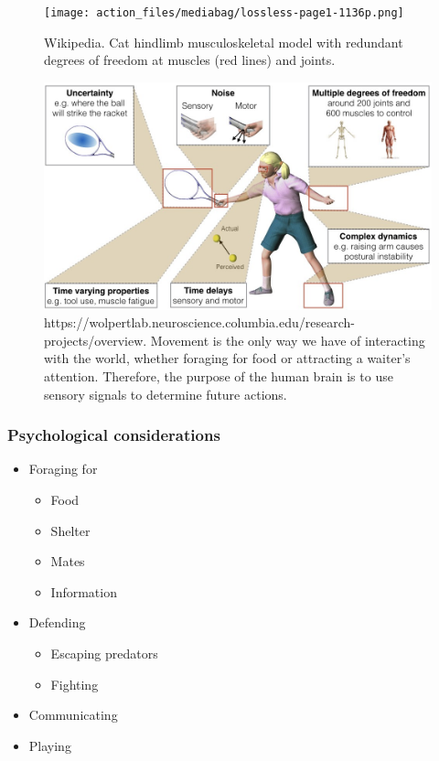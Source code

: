 \documentclass[
  letterpaper,
  DIV=11,
  numbers=noendperiod]{scrartcl}
\providecommand{\tightlist}{%
  \setlength{\itemsep}{0pt}\setlength{\parskip}{0pt}}\usepackage{longtable,booktabs,array}
\begin{document}
\begin{figure}[H]

{\centering \texttt{[image: action\_files/mediabag/lossless-page1-1136p.png]}

}

\caption{Wikipedia. Cat hindlimb musculoskeletal model with redundant
degrees of freedom at muscles (red lines) and joints.}

\end{figure}%
\begin{figure}[H]

{\centering \includegraphics{action_files/mediabag/overview.jpg}

}

\caption{https://wolpertlab.neuroscience.columbia.edu/research-projects/overview.
Movement is the only way we have of interacting with the world, whether
foraging for food or attracting a waiter's attention. Therefore, the
purpose of the human brain is to use sensory signals to determine future
actions.}

\end{figure}%

\subsubsection{Psychological
considerations}\label{psychological-considerations}

\begin{itemize}
\tightlist
\item
  Foraging for

  \begin{itemize}
  \tightlist
  \item
    Food
  \item
    Shelter
  \item
    Mates
  \item
    Information
  \end{itemize}
\item
  Defending

  \begin{itemize}
  \tightlist
  \item
    Escaping predators
  \item
    Fighting
  \end{itemize}
\item
  Communicating
\item
  Playing
\end{itemize}
\end{document}
